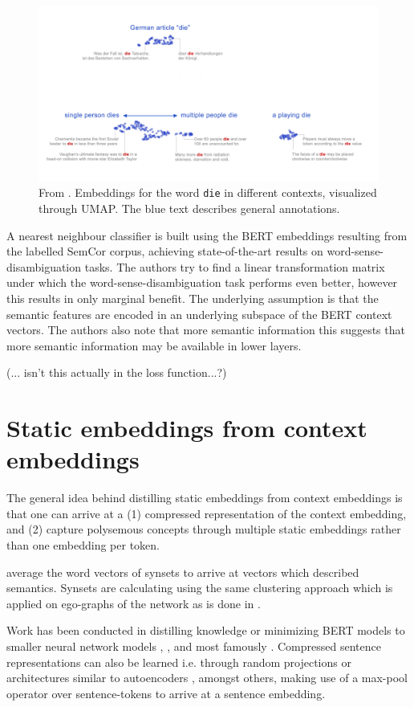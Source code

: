 \documentclass[a4paper,12pt,twoside,openright]{report}
\begin{document}
\begin{figure}[H]
	\center
  \includegraphics[width=0.7\linewidth]{./assets/relatedwork/BERT_plurality.png}
  \caption{From \cite{coenen19}. Embeddings for the word \texttt{die} in different contexts, visualized through UMAP. The blue text describes general annotations.}
  \label{fig:BERT_plurality}
\end{figure}

A nearest neighbour classifier is built using the BERT embeddings resulting from the labelled SemCor corpus, achieving state-of-the-art results on word-sense-disambiguation tasks.
The authors try to find a linear transformation matrix under which the word-sense-disambiguation task performs even better, however this results in only marginal benefit.
The underlying assumption is that the semantic features are encoded in an underlying subspace of the BERT context vectors.
The authors also note that more semantic information this suggests that more semantic information may be available in lower layers.

(... isn't this actually in the loss function...?)


\section{Static embeddings from context embeddings}

The general idea behind distilling static embeddings from context embeddings is that one can arrive at a (1) compressed representation of the context embedding, and (2) capture polysemous concepts through multiple static embeddings rather than one embedding per token.

\cite{remus13} average the word vectors of synsets to arrive at vectors which described semantics.
Synsets are calculating using the same clustering approach which is applied on ego-graphs of the network as is done in \cite{biemann06}.

Work has been conducted in distilling knowledge or minimizing  BERT models to smaller neural network models \cite{tang19}, \cite{tsai19}, and most famously \cite{sanh19}.
Compressed sentence representations can also be learned i.e. through random projections or architectures similar to autoencoders \cite{shen19}, amongst others, making use of a max-pool operator over sentence-tokens to arrive at a sentence embedding.
\end{document}
